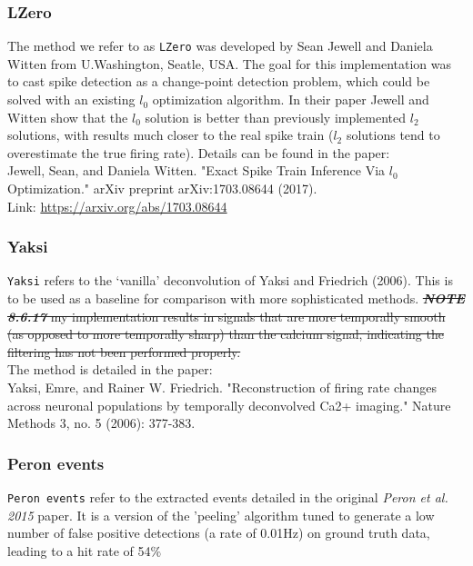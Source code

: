 \documentclass[a4paper]{article}
\begin{document}
\subsubsection*{LZero}
The method we refer to as \texttt{LZero} was developed by Sean Jewell and Daniela Witten from U.Washington, Seatle, USA. The goal for this implementation was to cast spike detection as a change-point detection problem, which could be solved with an existing $l_{0}$ optimization algorithm. In their paper Jewell and Witten show that the $l_{0}$ solution is better than previously implemented $l_{2}$ solutions, with results much closer to the real spike train ($l_{2}$ solutions tend to overestimate the true firing rate). Details can be found in the paper:\\

\noindent Jewell, Sean, and Daniela Witten. "Exact Spike Train Inference Via $l_{0}$ Optimization." arXiv preprint arXiv:1703.08644 (2017).\\

\noindent Link: \href{https://arxiv.org/abs/1703.08644}{https://arxiv.org/abs/1703.08644}

\subsubsection*{Yaksi}
\texttt{Yaksi} refers to the `vanilla' deconvolution of Yaksi and Friedrich (2006). This is to be used as a baseline for comparison with more sophisticated methods. \st{\textbf{\emph{NOTE 8.6.17}} my implementation results in signals that are more temporally smooth (as opposed to more temporally sharp) than the calcium signal, indicating the filtering has not been performed properly.} \\

\noindent The method is detailed in the paper: \\
\noindent Yaksi, Emre, and Rainer W. Friedrich. "Reconstruction of firing rate changes across neuronal populations by temporally deconvolved Ca2+ imaging." Nature Methods 3, no. 5 (2006): 377-383.


\subsubsection*{Peron events}
\texttt{Peron events} refer to the extracted events detailed in the original \emph{Peron et al. 2015} paper. It is a version of the 'peeling' algorithm tuned to generate a low number of false positive detections (a rate of 0.01Hz) on ground truth data, leading to a hit rate of 54$\%$
\end{document}
